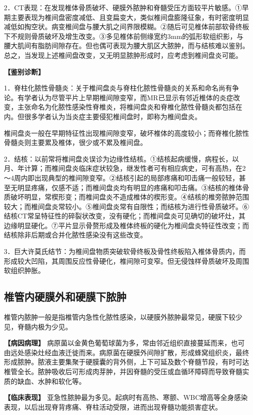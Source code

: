 2．CT表现：在发现椎体骨质破坏、硬膜外脓肿和脊髓受压方面较平片敏感。①早期主要表现为椎间盘密度减低、且变扁变大，类似椎间盘膨隆征象，有时密度明显减低如掏空状。病变椎间盘与腰大肌之间界限模糊。②随后可见椎体前部软骨终板下不规则骨质破坏及增生改变。③多见椎体前侧缘宽约3mm的弧形软组织影，与腰大肌间有脂肪间隙存在。但也偶可表现为腰大肌区大脓肿，而与结核难以鉴别。总之，当发现上述椎间盘改变，又无明显脓肿形成时，应考虑到椎间盘炎可能。

\textbf{【鉴别诊断】}

1．脊柱化脓性骨髓炎：关于椎间盘炎与脊柱化脓性骨髓炎的关系和命名尚有争论。有学者认为尽管平片上早期椎间隙变窄，而MR已显示有邻近椎体的炎症改变，主张命名为化脓性感染性脊椎炎，将椎间盘炎和脊椎化脓性骨髓炎都包括在内。但很多学者认为当炎症主要侵犯椎间盘时，即称为椎间盘炎。

椎间盘炎一般在早期特征性出现椎间隙变窄，破坏椎体的高度较小；而脊椎化脓性骨髓炎则主要累及椎体，很少或不累及椎间盘。

2．结核：以前常将椎间盘炎误诊为边缘性结核。①结核起病缓慢，病程长，以月、年计算；而椎间盘炎临床症状较急，继发性者可有相应病史，可有高热，在2～4周内即出现典型的椎间隙变窄。②结核引起的局部疼痛和叩击痛一般较轻，甚至无明显疼痛，仅感不适；而椎间盘炎均有明显的疼痛和叩击痛。③结核的椎体骨质破坏明显，常楔形变；而椎间盘炎不造成椎体的楔形变。④结核的椎旁脓肿范围较大；而椎间盘炎常较小。⑤椎间盘炎常有自限性；而结核为进行性骨质破坏。⑥结核CT常呈特征性的碎裂状改变，没有硬化；而椎间盘炎可见确切的破坏灶，其边缘明显硬化。⑦平片显示骨赘形成及椎体终板的硬化为椎间盘炎特征性改变；而结核除非后期或合并化脓性感染没有这些改变。

3．巨大许莫氏结节：为椎间盘物质突破软骨终板及骨性终板陷入椎体骨质内，而形成较大凹陷，其周围反应性骨硬化，椎间隙可变窄。但无侵蚀样骨质破坏及周围软组织肿胀。

\subsection{椎管内硬膜外和硬膜下脓肿}

椎管内脓肿一般是指椎管内急性化脓性感染，以硬膜外脓肿最常见，硬膜下较少见，脊髓内极为少见。

\textbf{【病因病理】}
病原菌以金黄色葡萄球菌为多，常由邻近组织直接蔓延而来，也可由远处感染灶经血液迁徙而来。病原菌在硬膜外间隙扩散，形成蜂窝组织炎，最终形成脓肿。脓液主要集聚于硬膜囊的背外侧，上下可延及数个脊髓节段，有时可达椎管全长。脓肿吸收后可形成肉芽肿，并因脊髓的受压或血循环障碍而导致脊髓实质的缺血、水肿和软化等。

\textbf{【临床表现】}
亚急性脓肿最为多见。起病时有高热、寒颤、WBC增高等全身感染表现，以后出现脊背疼痛、脊柱活动受限，进而出现脊髓功能损害症状。

